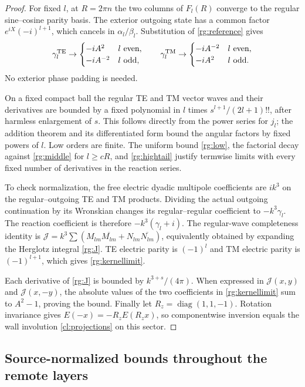 \begin{proof}
For fixed $l$, at $R=2\pi n$ the two columns of $F_l(R)$
converge to the regular sine--cosine parity basis.
The exterior outgoing state has a common factor
$e^{iX}(-i)^{l+1}$, which cancels in $\alpha_l/\beta_l$.
Substitution of \eqref{rg:reference} gives
\[
 \gamma_l^{\rm TE}\to
 \begin{cases}-iA^2&l\ \text{even},\\-iA^{-2}&l\ \text{odd},
 \end{cases}\qquad
 \gamma_l^{\rm TM}\to
 \begin{cases}-iA^{-2}&l\ \text{even},\\-iA^2&l\ \text{odd}.
 \end{cases}
\]
No exterior phase padding is needed.

On a fixed compact ball the regular TE and TM vector waves
and their derivatives are bounded by a fixed polynomial in $l$
times $s^{l+1}/(2l+1)!!$, after harmless enlargement of $s$.
This follows directly from the power series for $j_l$;
the addition theorem and its differentiated form bound the
angular factors by fixed powers of $l$. Low orders are finite.
The uniform bound \eqref{rg:low}, the factorial decay against
\eqref{rg:middle} for $l\geq cR$, and
\eqref{rg:hightail} justify termwise limits with every fixed
number of derivatives in the reaction series.

To check normalization, the free electric dyadic multipole
coefficients are $ik^3$ on the regular--outgoing TE and TM
products. Dividing the actual outgoing continuation by its
Wronskian changes its regular--regular coefficient to
$-k^3\gamma_l$. The reaction coefficient is therefore
$-k^3(\gamma_l+i)$. The regular-wave completeness identity is
$\mathcal J=k^3\sum(M_{lm}\overline{M_{lm}}+
N_{lm}\overline{N_{lm}})$, equivalently obtained by expanding
the Herglotz integral \eqref{rg:J}. TE electric parity is
$(-1)^l$ and TM electric parity is $(-1)^{l+1}$, which gives
\eqref{rg:kernellimit}.

Each derivative of \eqref{rg:J} is bounded by
$k^{3+s}/(4\pi)$. When expressed in $\mathcal J(x,y)$ and
$\mathcal J(x,-y)$, the absolute values of the two coefficients
in \eqref{rg:kernellimit} sum to $A^2-1$, proving the bound.
Finally let $R_z=\operatorname{diag}(1,1,-1)$.
Rotation invariance gives
$E(-x)=-R_zE(R_zx)$, so componentwise inversion equals the
wall involution \eqref{cl:projections} on this sector.
\end{proof}

\subsection{Source-normalized bounds throughout the remote layers}

